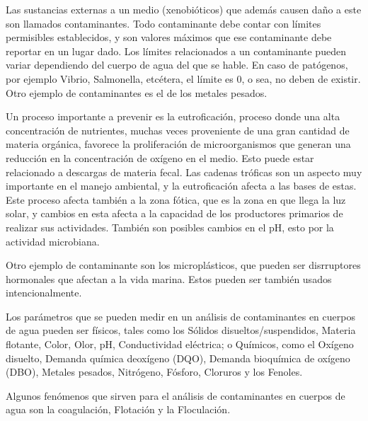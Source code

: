 Las sustancias externas a un medio (xenobióticos) que además causen daño a este son llamados contaminantes.
Todo contaminante debe contar con límites permisibles establecidos, y son valores máximos que ese contaminante debe reportar en un lugar dado. Los límites relacionados a un contaminante pueden variar dependiendo del cuerpo de agua del que se hable.
En caso de patógenos, por ejemplo Vibrio, Salmonella, etcétera, el límite es 0, o sea, no deben de existir. Otro ejemplo de contaminantes es el de los metales pesados.

Un proceso importante a prevenir es la eutroficación, proceso donde una alta concentración de nutrientes, muchas veces proveniente de una gran cantidad de materia orgánica, favorece la proliferación de microorganismos que generan una reducción en la concentración de oxígeno en el medio. Esto puede estar relacionado a descargas de materia fecal.
Las cadenas tróficas son un aspecto muy importante en el manejo ambiental, y la eutroficación afecta a las bases de estas. Este proceso afecta también a la zona fótica, que es la zona en que llega la luz solar, y cambios en esta afecta a la capacidad de los productores primarios de realizar sus actividades.
También son posibles cambios en el pH, esto por la actividad microbiana.

Otro ejemplo de contaminante son los microplásticos, que pueden ser disrruptores hormonales que afectan a la vida marina. Estos pueden ser también usados intencionalmente.

Los parámetros que se pueden medir en un análisis de contaminantes en cuerpos de agua pueden ser físicos, tales como los Sólidos disueltos/suspendidos, Materia flotante, Color, Olor, pH, Conductividad eléctrica; o Químicos, como el Oxígeno disuelto, Demanda química deoxígeno (DQO), Demanda bioquímica de oxígeno (DBO), Metales pesados, Nitrógeno, Fósforo, Cloruros	y los Fenoles.

Algunos fenómenos que sirven para el análisis de contaminantes en cuerpos de agua son la coagulación, Flotación y la Floculación.